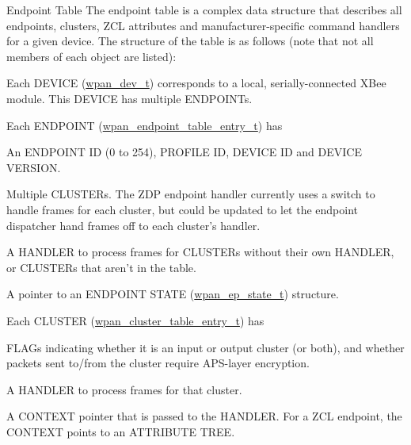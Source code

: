 \begin{DoxyParagraph}{Endpoint Table}
The endpoint table is a complex data structure that describes all endpoints, clusters, Z\-C\-L attributes and manufacturer-\/specific command handlers for a given device. The structure of the table is as follows (note that not all members of each object are listed)\-:
\begin{DoxyItemize}
\item Each D\-E\-V\-I\-C\-E (\hyperlink{structwpan__dev__t}{wpan\-\_\-dev\-\_\-t}) corresponds to a local, serially-\/connected X\-Bee module. This D\-E\-V\-I\-C\-E has multiple E\-N\-D\-P\-O\-I\-N\-Ts.
\item Each E\-N\-D\-P\-O\-I\-N\-T (\hyperlink{structwpan__endpoint__table__entry__t}{wpan\-\_\-endpoint\-\_\-table\-\_\-entry\-\_\-t}) has
\begin{DoxyItemize}
\item An E\-N\-D\-P\-O\-I\-N\-T I\-D (0 to 254), P\-R\-O\-F\-I\-L\-E I\-D, D\-E\-V\-I\-C\-E I\-D and D\-E\-V\-I\-C\-E V\-E\-R\-S\-I\-O\-N.
\item Multiple C\-L\-U\-S\-T\-E\-Rs. The Z\-D\-P endpoint handler currently uses a switch to handle frames for each cluster, but could be updated to let the endpoint dispatcher hand frames off to each cluster's handler.
\item A H\-A\-N\-D\-L\-E\-R to process frames for C\-L\-U\-S\-T\-E\-Rs without their own H\-A\-N\-D\-L\-E\-R, or C\-L\-U\-S\-T\-E\-Rs that aren't in the table.
\item A pointer to an E\-N\-D\-P\-O\-I\-N\-T S\-T\-A\-T\-E (\hyperlink{structwpan__ep__state__t}{wpan\-\_\-ep\-\_\-state\-\_\-t}) structure.
\end{DoxyItemize}
\item Each C\-L\-U\-S\-T\-E\-R (\hyperlink{structwpan__cluster__table__entry__t}{wpan\-\_\-cluster\-\_\-table\-\_\-entry\-\_\-t}) has
\begin{DoxyItemize}
\item F\-L\-A\-Gs indicating whether it is an input or output cluster (or both), and whether packets sent to/from the cluster require A\-P\-S-\/layer encryption.
\item A H\-A\-N\-D\-L\-E\-R to process frames for that cluster.
\item A C\-O\-N\-T\-E\-X\-T pointer that is passed to the H\-A\-N\-D\-L\-E\-R. For a Z\-C\-L endpoint, the C\-O\-N\-T\-E\-X\-T points to an A\-T\-T\-R\-I\-B\-U\-T\-E T\-R\-E\-E.
\end{DoxyItemize}
\end{DoxyItemize}
\end{DoxyParagraph}

